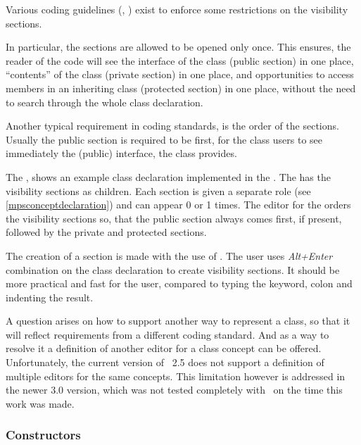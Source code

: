 Various coding guidelines (\cite{cppclasslayout}, \cite{googlecppstyle}) exist to enforce some 
restrictions on the visibility sections.

In particular, the sections are allowed to be opened only once. This ensures, the
reader of the code will see the interface of the class (public section) in one place,
``contents'' of the class (private section) in one place, and opportunities to access members in
an inheriting class (protected section) in one place, without the need to search through
the whole class declaration.

Another typical requirement in coding standards, is the order of the sections. Usually the public 
section is required to be first, for the class users to see immediately the (public) interface,
the class provides.



\pcppsolution



The , shows an example class declaration implemented in the \pcpp.
The   has the visibility sections as children. Each section is given a separate role 
(see \ref{mpsconceptdeclaration}) and can appear 0 or 1 times. The editor for the   
orders the visibility sections so, that the public section always comes first, if present, 
followed by the private and protected sections.

The creation of a section is made with the use of . The user
uses \emph{Alt+Enter} combination on the class declaration to create visibility sections.
It should be more practical and fast for the user, compared to typing the keyword, colon and
indenting the result.

A question arises on how to support another way to represent a class, so that it will reflect
requirements from a different coding standard. And as a way to resolve it a definition of 
another editor for a class concept can be offered. Unfortunately, the current version of \jbmps\ 2.5
does not support a definition of multiple editors for the same concepts. This limitation however
is addressed in the newer 3.0 version, which was not tested completely with \mbdr\ on the time
this work was made.


\subsubsection{Constructors}
\label{classconstructors}

